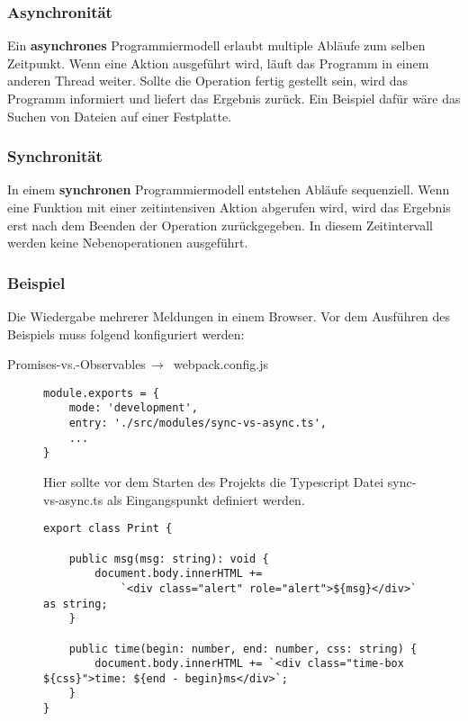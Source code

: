 \subsubsection{Asynchronität}

Ein \textbf{asynchrones} Programmiermodell erlaubt multiple Abläufe zum selben Zeitpunkt. Wenn eine Aktion ausgeführt wird, läuft das Programm in einem anderen \glqq Thread\grqq{} weiter. Sollte die Operation fertig gestellt sein, wird das Programm informiert und liefert das Ergebnis zurück. Ein Beispiel dafür wäre das Suchen von Dateien auf einer Festplatte.\cite{asynchronitaet} \\

\subsubsection{Synchronität}

In einem \textbf{synchronen} Programmiermodell entstehen Abläufe sequenziell. Wenn eine Funktion mit einer zeitintensiven Aktion abgerufen wird, wird das Ergebnis erst nach dem Beenden der Operation zurückgegeben. In diesem Zeitintervall werden keine Nebenoperationen ausgeführt.\cite{asynchronitaet} \\

\subsubsection{Beispiel}

Die Wiedergabe mehrerer Meldungen in einem Browser. Vor dem Ausführen des Beispiels muss folgend konfiguriert werden:

\begin{center}
    Promises-vs.-Observables$\,\to\,$ webpack.config.js
\end{center}

\begin{figure}[H]
\begin{lstlisting}
module.exports = {
    mode: 'development',
    entry: './src/modules/sync-vs-async.ts',
    ...
}
\end{lstlisting}
\caption{Hier sollte vor dem Starten des Projekts die Typescript Datei sync-vs-async.ts als Eingangspunkt definiert werden.}
\end{figure}

\begin{figure}[H]
\begin{lstlisting}
export class Print {

    public msg(msg: string): void {
        document.body.innerHTML +=
            `<div class="alert" role="alert">${msg}</div>` as string;
    }

    public time(begin: number, end: number, css: string) {
        document.body.innerHTML += `<div class="time-box ${css}">time: ${end - begin}ms</div>`;
    }
}
\end{lstlisting}
\end{figure}

